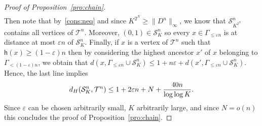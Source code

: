 \documentclass[10pt]{amsart}
\theoremstyle{definition}\newtheorem{defi}[theo]{Definition}\newtheorem{rema}[theo]{Remark}\newtheorem{exam}[theo]{Example}\newtheorem{exem}[theo]{Example}\newtheorem{nota}[theo]{Notation}
\newcommand{\e}{\varepsilon}
\newcommand{\1}{\mathbbm{1}}
\newcommand{\trail}{\mathcal{S}}
\newcommand{\T}{\mathcal{T}}
\newcommand{\h}{\mathsf{h}}
\let\originalleft\left
\let\originalright\right
\renewcommand{\left}{\mathopen{}\mathclose\bgroup\originalleft}
\renewcommand{\right}{\aftergroup\egroup\originalright}
\begin{document}
\begin{proof}[Proof of Proposition~\ref{pro:chain}]
\begin{multline*}
\end{multline*}
Then note that by~\ref{cons:neq} and since $K^{2^N}\geq \|D^n\|_\infty$, we know that $\trail_{K^{2^N}}^n$ contains all vertices of $\T^n$. Moreover, $(0,1)\in \trail_K^n$ so every $x\in \Gamma_{\leq \e n}$ is at distance at most $\e n$ of $\trail_K^n$. Finally, if $x$ is a vertex of $\T^n$ such that $\h (x) \ge (1-\e)n$ then by considering the highest ancestor $x'$ of $x$ belonging to $\Gamma_{<(1-\e)n}$, we obtain that $d(x,\Gamma_{\le \e n} \cup \trail^n_K) \le 1+ n\e +d(x',\Gamma_{\le \e n} \cup\trail^n_K)$. Hence, the last line implies
\[
d_H \left(\trail_K^n, \T^n \right) \leq 1+ 2\e n + N+\frac{40n}{\log \log K}.
\]
Since $\e$ can be chosen arbitrarily small, $K$ arbitrarily large, and since $N=o(n)$ this concludes the proof of Proposition~\ref{pro:chain}.
\end{proof}
\end{document}
